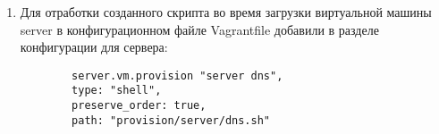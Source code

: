\begin{enumerate}
    \item Для отработки созданного скрипта во время загрузки виртуальной машины server в конфигурационном файле Vagrantfile добавили в разделе конфигурации для сервера:
        \begin{verbatim}
        server.vm.provision "server dns",
        type: "shell",
        preserve_order: true,
        path: "provision/server/dns.sh"
        \end{verbatim}
\end{enumerate}


